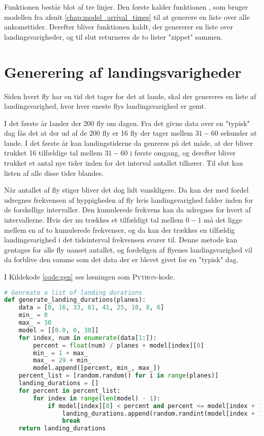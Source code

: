 Funktionen  består blot af tre linjer.
Den første kalder funktionen  , som bruger modellen fra afsnit \ref{chap:model_arrival_times} til at generere en liste over alle ankomsttider.
Derefter bliver funktionen  kaldt, der genererer en liste over landingsvarigheder, og til slut returneres de to lister "zippet" sammen.

\section{Generering af landingsvarigheder} \label{chap:landing_durations}
Siden hvert fly har en tid det tager for det at lande, skal der genereres en liste af landingsvarighed, hvor hver eneste flys landingsvarighed er gemt.

I det første år lander der 200 fly om dagen. Fra det givne data over en "typisk" dag fås det at der ud af de 200 fly er 16 fly der tager mellem $31 - 60$ sekunder at lande.
I det første år kan landingstiderne da genreres på det måde, at der bliver trukket 16 tilfældige tal mellem $31 - 60$ i første omgang, og derefter bliver trukket et antal nye tider inden for det interval antallet tilhører.
Til slut kan listen af alle disse tider blandes.

Når antallet af fly stiger bliver det dog lidt vanskligere.
Da kan der med fordel udregnes frekvensen af hyppigheden af fly hvis landingsvarighed falder inden for de forskellige intervaller.
Den kumulerede frekvens kan da udregnes for hvert af intervallerne.
Hvis der nu trækkes et tilfældigt tal mellem $0-1$ må det ligge mellem en af to kumulerede frekvenser, og da kan der trækkes en tilfældig landingsvarighed i det tidsinterval frekvensen svarer til.
Denne metode kan gentages for alle fly uanset antallet, og fordeligen af flyenes landingsvarighed vil da forblive den samme som det data der er blevet givet for en "typisk" dag. 

I Kildekode \ref{code:gen} ses løsningen som \textsc{Python}-kode.

\begin{lstlisting}[language=Python, caption={generate\_landing\_durations-funktionen i airplanes.py}, label=code:gen]
# Genreate a list of landing durations
def generate_landing_durations(planes):
    data = [0, 16, 33, 61, 41, 25, 10, 8, 6]
    min_ = 0
    max_ = 30
    model = [[0.0, 0, 30]]
    for index, num in enumerate(data[1:]):
        percent = float(num) / planes + model[index][0]
        min_ = 1 + max_
        max_ = 29 + min_
        model.append([percent, min_, max_])
    percent_list = [random.random() for i in range(planes)]
    landing_durations = []
    for percent in percent_list:
        for index in range(len(model) - 1):
            if model[index][0] < percent and percent <= model[index + 1][0]:
                landing_durations.append(random.randint(model[index + 1][1], model[index + 1][2]))
                break
    return landing_durations
\end{lstlisting}

